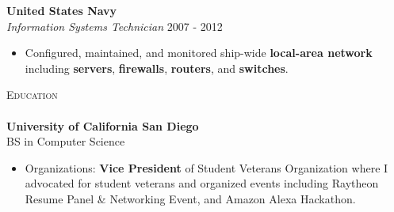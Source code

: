 \documentclass[a4paper]{article}
\newcommand{\lineunder} {
    \vspace*{-8pt} \\
    \hspace*{-18pt} \hrulefill \\
}
\newcommand{\header} [1] {
    {\hspace*{-18pt}\vspace*{6pt} \textsc{#1}}
    \vspace*{-6pt} \lineunder
}
\begin{document}
\textbf{United States Navy} \hfill \\
\textit{Information Systems Technician} \hfill 2007 - 2012\\
\vspace{-1mm}
\begin{itemize} \itemsep 1pt
	\item Configured, maintained, and monitored ship-wide \textbf{local-area network} including \textbf{servers}, \textbf{firewalls}, \textbf{routers}, and \textbf{switches}.
\end{itemize}

\header{Education}
\textbf{University of California San Diego}\hfill \\
BS in Computer Science \hfill \\
\begin{itemize} \itemsep 1pt
	\item Organizations: \textbf{Vice President} of Student Veterans Organization where I advocated for student veterans and organized events including Raytheon Resume Panel \& Networking Event, and Amazon Alexa Hackathon.
\end{itemize}

\vspace{2mm}
\end{document}
